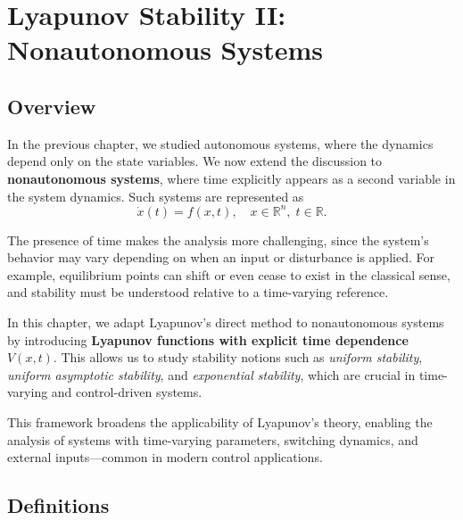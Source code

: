 \chapterspaceabove{6.75cm} %
\chapterspacebelow{7.25cm} %

\chapter{Lyapunov Stability II: Nonautonomous Systems}

\section{Overview}
In the previous chapter, we studied autonomous systems, where the dynamics depend only on the state variables. We now extend the discussion to \textbf{nonautonomous systems}, where time explicitly appears as a second variable in the system dynamics. Such systems are represented as
\begin{equation}
\dot{x}(t) = f(x,t), \quad x \in \mathbb{R}^n, \; t \in \mathbb{R}.
\end{equation}

The presence of time makes the analysis more challenging, since the system’s behavior may vary depending on when an input or disturbance is applied. For example, equilibrium points can shift or even cease to exist in the classical sense, and stability must be understood relative to a time-varying reference.

In this chapter, we adapt Lyapunov’s direct method to nonautonomous systems by introducing \textbf{Lyapunov functions with explicit time dependence} \( V(x,t) \). This allows us to study stability notions such as \textit{uniform stability}, \textit{uniform asymptotic stability}, and \textit{exponential stability}, which are crucial in time-varying and control-driven systems.

This framework broadens the applicability of Lyapunov’s theory, enabling the analysis of systems with time-varying parameters, switching dynamics, and external inputs---common in modern control applications.

\section{Definitions}

